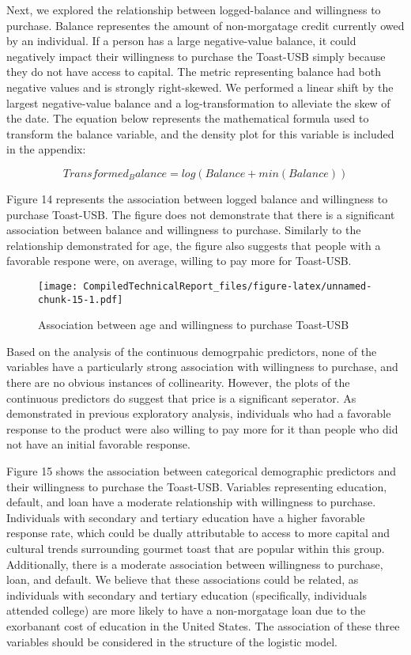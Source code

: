 \documentclass[]{article}
\begin{document}
Next, we explored the relationship between logged-balance and
willingness to purchase. Balance representes the amount of non-morgatage
credit currently owed by an individual. If a person has a large
negative-value balance, it could negatively impact their willingness to
purchase the Toast-USB simply because they do not have access to
capital. The metric representing balance had both negative values and is
strongly right-skewed. We performed a linear shift by the largest
negative-value balance and a log-transformation to alleviate the skew of
the date. The equation below represents the mathematical formula used to
transform the balance variable, and the density plot for this variable
is included in the appendix:

\[Transformed_Balance = log(Balance + min(Balance))\]

Figure 14 represents the association between logged balance and
willingness to purchase Toast-USB. The figure does not demonstrate that
there is a significant association between balance and willingness to
purchase. Similarly to the relationship demonstrated for age, the figure
also suggests that people with a favorable respone were, on average,
willing to pay more for Toast-USB.

\begin{figure}
\centering
\texttt{[image: CompiledTechnicalReport\_files/figure-latex/unnamed-chunk-15-1.pdf]}
\caption{Association between age and willingness to purchase Toast-USB}
\end{figure}

Based on the analysis of the continuous demogrpahic predictors, none of
the variables have a particularly strong association with willingness to
purchase, and there are no obvious instances of collinearity. However,
the plots of the continuous predictors do suggest that price is a
significant seperator. As demonstrated in previous exploratory analysis,
individuals who had a favorable response to the product were also
willing to pay more for it than people who did not have an initial
favorable response.

Figure 15 shows the association between categorical demographic
predictors and their willingness to purchase the Toast-USB. Variables
representing education, default, and loan have a moderate relationship
with willingness to purchase. Individuals with secondary and tertiary
education have a higher favorable response rate, which could be dually
attributable to access to more capital and cultural trends surrounding
gourmet toast that are popular within this group. Additionally, there is
a moderate association between willingness to purchase, loan, and
default. We believe that these associations could be related, as
individuals with secondary and tertiary education (specifically,
individuals attended college) are more likely to have a non-morgatage
loan due to the exorbanant cost of education in the United States. The
association of these three variables should be considered in the
structure of the logistic model.
\end{document}
